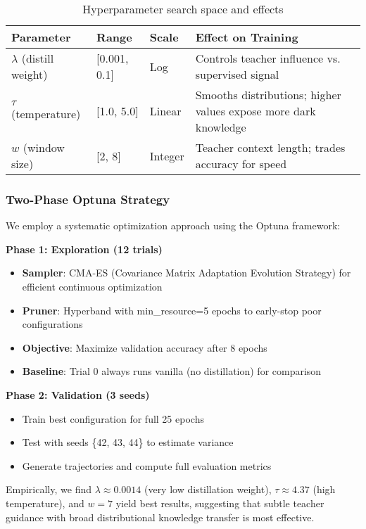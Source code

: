 \begin{table}[h]
\centering
\caption{Hyperparameter search space and effects}
\label{tab:hparam-space}
\small
\begin{tabular}{lllp{5cm}}
\toprule
\textbf{Parameter} & \textbf{Range} & \textbf{Scale} & \textbf{Effect on Training} \\
\midrule
$\lambda$ (distill weight) & [0.001, 0.1] & Log & Controls teacher influence vs. supervised signal \\
$\tau$ (temperature) & [1.0, 5.0] & Linear & Smooths distributions; higher values expose more dark knowledge \\
$w$ (window size) & [2, 8] & Integer & Teacher context length; trades accuracy for speed \\
\bottomrule
\end{tabular}
\end{table}

\subsubsection{Two-Phase Optuna Strategy}
We employ a systematic optimization approach using the Optuna framework:

\textbf{Phase 1: Exploration (12 trials)}
\begin{itemize}[noitemsep,topsep=0pt]
\item \textbf{Sampler}: CMA-ES (Covariance Matrix Adaptation Evolution Strategy) for efficient continuous optimization
\item \textbf{Pruner}: Hyperband with min\_resource=5 epochs to early-stop poor configurations
\item \textbf{Objective}: Maximize validation accuracy after 8 epochs
\item \textbf{Baseline}: Trial 0 always runs vanilla (no distillation) for comparison
\end{itemize}

\textbf{Phase 2: Validation (3 seeds)}
\begin{itemize}[noitemsep,topsep=0pt]
\item Train best configuration for full 25 epochs
\item Test with seeds \{42, 43, 44\} to estimate variance
\item Generate trajectories and compute full evaluation metrics
\end{itemize}

\begin{remark}
Empirically, we find $\lambda \approx 0.0014$ (very low distillation weight), $\tau \approx 4.37$ (high temperature), and $w = 7$ yield best results, suggesting that subtle teacher guidance with broad distributional knowledge transfer is most effective.
\end{remark}

